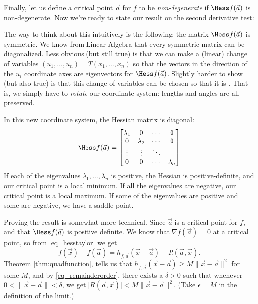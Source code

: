 Finally, let us define a critical point $\vec{a}$ for $f$ to be {\em non-degenerate} if $\Hess f(\vec{a})$ is non-degenerate.  Now we're ready to state our result on the second derivative test:

The way to think about this intuitively is the following: the matrix $\Hess f(\vec{a})$ is symmetric. We know from Linear Algebra that every symmetric matrix can be diagonalized. Less obvious (but still true) is that we can make a (linear) change of variables $(u_1,\ldots, u_n) = T(x_1,\ldots, x_n)$ so that the vectors in the direction of the $u_i$ coordinate axes are eigenvectors for $\Hess f(\vec{a})$. Slightly harder to show (but also true) is that this change of variables can be chosen so that it is . That is, we simply have to \emph{rotate} our coordinate system: lengths and angles are all preserved.

In this new coordinate system, the Hessian matrix is diagonal:
\[
\Hess f(\vec{a}) = \begin{bmatrix} \lambda_1 & 0 & \cdots & 0\\
								  0 & \lambda_2 & \cdots & 0\\
								  \vdots & \vdots & \ddots & \vdots\\
								  0 & 0 & \cdots & \lambda_n\end{bmatrix}
\]
If each of the eigenvalues $\lambda_1,\ldots, \lambda_n$ is positive, the Hessian is positive-definite, and our critical point is a local minimum. If all the eigenvalues are negative, our critical point is a local maximum. If some of the eigenvalues are positive and some are negative, we have a saddle point.

Proving the result is somewhat more technical. Since $\vec{a}$ is a critical point for $f$, and that $\Hess f(\vec{a})$ is positive definite. We know that $\nabla f(\vec{a})=0$ at a critical point, so from \eqref{eq_hesstaylor} we get
\[
f(\vec{x})-f(\vec{a}) = h_{f,\vec{a}}(\vec{x}-\vec{a})+R(\vec{a},\vec{x}).
\]
Theorem \ref{thm:quadfunction}, tells us that $h_{f,\vec{a}}(\vec{x}-\vec{a})\geq M\lVert\vec{x}-\vec{a}\rVert^2$ for some $M$, and by \eqref{eq_remainderorder}, there exists a $\delta>0$ such that whenever $0<\lVert \vec{x}-\vec{a}\rVert<\delta$, we get $\lvert R(\vec{a},\vec{x})\rvert<M\lVert \vec{x}-\vec{a}\rVert^2$. (Take $\epsilon=M$ in the definition of the limit.) 

